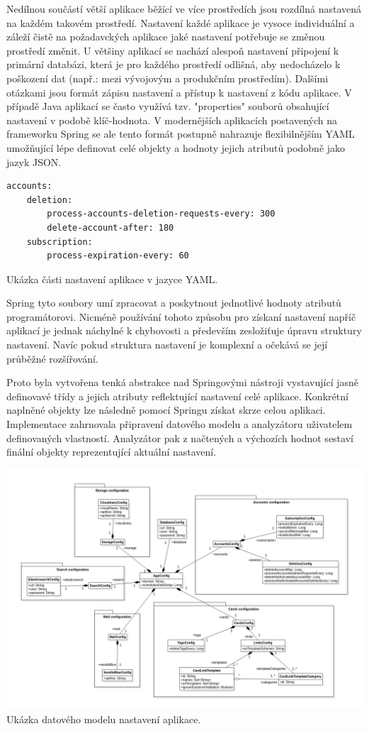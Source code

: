 		Nedílnou součástí větší aplikace běžící ve více prostředích jsou rozdílná nastavená na každém takovém prostředí.
		Nastavení každé aplikace je vysoce individuální a záleží čistě na požadavckých aplikace jaké nastavení potřebuje
		se změnou prostředí změnit.
		U většiny aplikací se nachází alespoň nastavení připojení k primární databázi, která je pro každého prostředí
		odlišná, aby nedocházelo k poškození dat (např.: mezi vývojovým a produkčním prostředím).
		Dalšími otázkami jsou formát zápisu nastavení a přístup k nastavení z kódu aplikace.
		V případě Java aplikací se často využívá tzv. "properties" souborů obsahující nastavení v podobě klíč-hodnota.
		V modernějších aplikacích postavených na frameworku Spring se ale tento formát postupně nahrazuje flexibilnějším
		\ac{YAML} umožňující lépe definovat celé objekty a hodnoty jejich atributů podobně jako jazyk \ac{JSON}.

		\begin{lstlisting}
accounts:
	deletion:
		process-accounts-deletion-requests-every: 300
		delete-account-after: 180
	subscription:
		process-expiration-every: 60
		\end{lstlisting}
		Ukázka části nastavení aplikace v jazyce YAML. %

		Spring tyto soubory umí zpracovat a poskytnout jednotlivé hodnoty atributů programátorovi.
		Nicméně používání tohoto způsobu pro získaní nastavení napříč aplikací je jednak náchylné k chybovosti a
		především zesložiťuje úpravu struktury nastavení.
		Navíc pokud struktura nastavení je komplexní a očekává se její průběžné rozšířování.

		Proto byla vytvořena tenká abstrakce nad Springovými nástroji vystavující jasně definovavé třídy a jejich atributy
		reflektující nastavení celé aplikace.
		Konkrétní naplněné objekty lze následně pomocí Springu získat skrze celou aplikaci.
		Implementace zahrnovala připravení datového modelu a analyzátoru uživatelem definovaných vlastností.
		Analyzátor pak z načtených a výchozích hodnot sestaví finální objekty reprezentující aktuální nastavení.

		\includegraphics{obrazky/datovy_model_nastaveni_aplikace}\hfill
		Ukázka datového modelu nastavení aplikace. %

